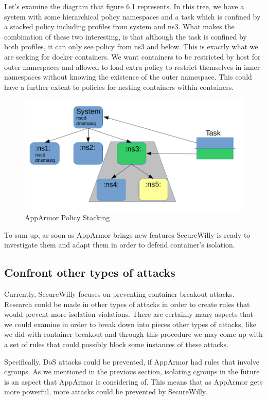 Let's examine the diagram that figure 6.1 represents. In this tree, we have a system with some hierarchical policy namespaces and a task which is confined by a stacked policy including profiles from system and ns3. What makes the combination of these two interesting, is that although the task is confined by both profiles, it can only see policy from ns3 and below. This is exactly what we are seeking for docker containers. We want containers to be restricted by host for outer namespaces and allowed to load extra policy to restrict themselves in inner namespaces without knowing the existence of the outer namespace.
This could have a further extent to policies for nesting containers within containers.

\begin{figure}[h!]
  \centering
   \includegraphics[width=0.9\linewidth]{figures/policystacking1.png}
   \caption{AppArmor Policy Stacking}
\end{figure}
\hfill\break

To sum up, as soon as AppArmor brings new features SecureWilly is ready to investigate them and adapt them in order to defend container's isolation.

\subsection{Confront other types of attacks}
Currently, SecureWilly focuses on preventing container breakout attacks. Research could be made in other types of attacks in order to create rules that would prevent more isolation violations. There are certainly many aspects that we could examine in order to break down into pieces other types of attacks, like we did with container breakout and through this procedure we may come up with a set of rules that could possibly block some instances of these attacks.

Specifically, DoS attacks could be prevented, if AppArmor had rules that involve cgroups. As we mentioned in the previous section, isolating cgroups in the future is an aspect that AppArmor is considering of. This means that as AppArmor gets more powerful, more attacks could be prevented by SecureWilly.

